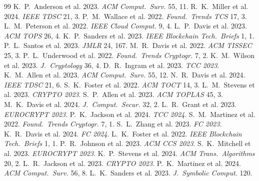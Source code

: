 \documentclass[sigconf,nonacm]{acmart}
\begin{document}
\sloppy

\begin{thebibliography}{99}
 K.~P.~Anderson et al. 2023. \textit{ACM Comput.\ Surv.} 55, 11.
 R.~K.~Miller et al. 2024. \textit{IEEE TDSC} 21, 3.
 P.~M.~Wallace et al. 2022. \textit{Found.\ Trends TCS} 17, 3.
 L.~M.~Peterson et al. 2022. \textit{IEEE Cloud Comput.} 9, 4.
 L.~P.~Davis et al. 2023. \textit{ACM TOPS} 26, 4.
 K.~P.~Sanders et al. 2023. \textit{IEEE Blockchain Tech.\ Briefs} 1, 1.
 P.~L.~Santos et al. 2023. \textit{JMLR} 24, 167.
 M.~R.~Davis et al. 2022. \textit{ACM TISSEC} 25, 3.
 P.~L.~Underwood et al. 2022. \textit{Found.\ Trends Cryptogr.} 7, 2.
 K.~M.~Wilson et al. 2023. \textit{J.\ Cryptology} 36, 4.
 D.~R.~Ingram et al. 2023. \textit{TCC 2023}.
 K.~M.~Allen et al. 2023. \textit{ACM Comput.\ Surv.} 55, 12.
 N.~R.~Davis et al. 2024. \textit{IEEE TDSC} 21, 6.
 S.~K.~Foster et al. 2022. \textit{ACM TOCT} 14, 3.
 L.~M.~Stevens et al. 2023. \textit{CRYPTO 2023}.
 S.~P.~Allen et al. 2023. \textit{ACM TOPLAS} 45, 3.
 M.~K.~Davis et al. 2024. \textit{J.\ Comput.\ Secur.} 32, 2.
 L.~R.~Grant et al. 2023. \textit{EUROCRYPT 2023}.
 P.~K.~Jackson et al. 2024. \textit{TCC 2024}.
 S.~M.~Martinez et al. 2022. \textit{Found.\ Trends Cryptogr.} 7, 1.
 S.~L.~Zhang et al. 2023. \textit{FC 2023}.
 K.~R.~Davis et al. 2024. \textit{FC 2024}.
 L.~K.~Foster et al. 2022. \textit{IEEE Blockchain Tech.\ Briefs} 1, 1.
 P.~R.~Johnson et al. 2023. \textit{ACM CCS 2023}.
 S.~K.~Mitchell et al. 2023. \textit{EUROCRYPT 2023}.
 K.~P.~Stevens et al. 2024. \textit{ACM Trans.\ Algorithms} 20, 2.
 L.~R.~Jackson et al. 2023. \textit{CRYPTO 2023}.
 P.~K.~Martinez et al. 2024. \textit{ACM Comput.\ Surv.} 56, 8.
 L.~K.~Sanders et al. 2023. \textit{J.\ Symbolic Comput.} 120.

\end{thebibliography}
\end{document}
